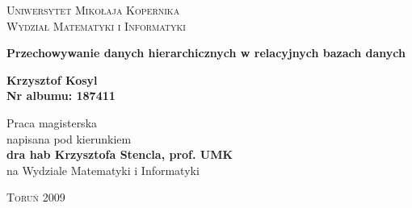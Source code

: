 


\begin{titlepage}
    \begin{center}
        \Large\scshape Uniwersytet Mikołaja Kopernika\\
        Wydział Matematyki i Informatyki
    \end{center}
    \vspace{22ex}
    \begin{center}
        \Huge\bfseries
        Przechowywanie danych hierarchicznych w relacyjnych bazach danych
    \end{center}
    \vspace{22ex}
    \begin{center}
        \Large\bfseries
        Krzysztof Kosyl \\
        \vspace{0.5ex}
        \normalsize
        Nr albumu: 187411
    \end{center}
    \vspace{19ex}
    \hspace*{\fill}
    \parbox{0.50\textwidth}{\setlength{\parindent}{1em}
            \normalsize
            \noindent
            Praca magisterska\\
            napisana pod kierunkiem\\
            \textbf{dra hab Krzysztofa Stencla, prof. UMK}\\
            na Wydziale Matematyki i Informatyki}
    \vfill
    \centerline{\textsc{Toruń} 2009}
    \addtocounter{page}{-1}
\end{titlepage}



% 
% 
% 
% 
% 
% 
% 
